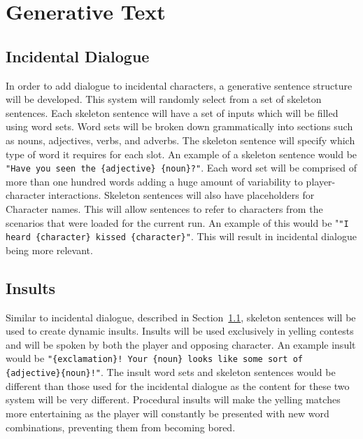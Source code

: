 \clearpage
\section{Generative Text}

\subsection{Incidental Dialogue}
\label{sec:incidental_dialogue}
In order to add dialogue to incidental characters, a generative sentence structure will be developed. This system will randomly select from a set of skeleton sentences. Each skeleton sentence will have a set of inputs which will be filled using word sets. Word sets will be broken down grammatically into sections such as nouns, adjectives, verbs, and adverbs. The skeleton sentence will specify which type of word it requires for each slot. An example of a skeleton sentence would be \verb|"Have you seen the {adjective} {noun}?"|. Each word set will be comprised  of more than one hundred words adding a huge amount of variability to player-character interactions. Skeleton sentences will also have placeholders for Character names. This will allow sentences to refer to characters from the scenarios that were loaded for the current run. An example of this would be "\verb|"I heard {character} kissed {character}"|. This will result in incidental dialogue being more relevant. 

\subsection{Insults}
Similar to incidental dialogue, described in Section~\ref{sec:incidental_dialogue}, skeleton sentences  will be used to create dynamic insults. Insults will be used exclusively in yelling contests and will be spoken by both the player and opposing character. An example insult would be \verb|"{exclamation}! Your {noun} looks like some sort of {adjective}{noun}!"|. The insult word sets and skeleton sentences would be different than those used for the incidental dialogue as the content for these two system will be very different. Procedural insults will make the yelling matches more entertaining as the player will constantly be presented with new word combinations, preventing them from becoming bored. 